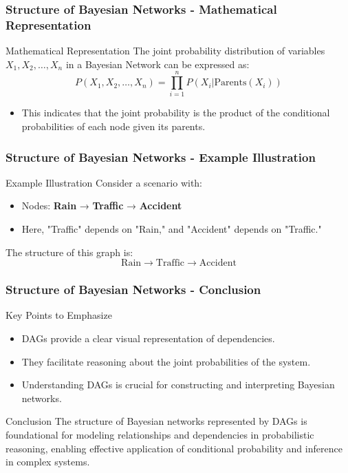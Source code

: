 \documentclass[aspectratio=169]{beamer}
\begin{document}
\begin{frame}[fragile]
    \frametitle{Structure of Bayesian Networks - Mathematical Representation}
    \begin{block}{Mathematical Representation}
        The joint probability distribution of variables \( X_1, X_2, \ldots, X_n \) in a Bayesian Network can be expressed as:
        \begin{equation}
            P(X_1, X_2, \ldots, X_n) = \prod_{i=1}^{n} P(X_i | \text{Parents}(X_i))
        \end{equation}
        \begin{itemize}
            \item This indicates that the joint probability is the product of the conditional probabilities of each node given its parents.
        \end{itemize}
    \end{block}
\end{frame}

\begin{frame}[fragile]
    \frametitle{Structure of Bayesian Networks - Example Illustration}
    \begin{block}{Example Illustration}
        Consider a scenario with:
        \begin{itemize}
            \item Nodes: \textbf{Rain} → \textbf{Traffic} → \textbf{Accident}
            \item Here, "Traffic" depends on "Rain," and "Accident" depends on "Traffic."
        \end{itemize}
        The structure of this graph is:
        \[
        \text{Rain} \rightarrow \text{Traffic} \rightarrow \text{Accident}
        \]
    \end{block}
\end{frame}

\begin{frame}[fragile]
    \frametitle{Structure of Bayesian Networks - Conclusion}
    \begin{block}{Key Points to Emphasize}
        \begin{itemize}
            \item DAGs provide a clear visual representation of dependencies.
            \item They facilitate reasoning about the joint probabilities of the system.
            \item Understanding DAGs is crucial for constructing and interpreting Bayesian networks.
        \end{itemize}
    \end{block}
    \begin{block}{Conclusion}
        The structure of Bayesian networks represented by DAGs is foundational for modeling relationships and dependencies in probabilistic reasoning, enabling effective application of conditional probability and inference in complex systems.
    \end{block}
\end{frame}
\end{document}
